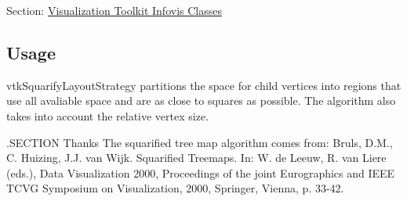 Section\-: \hyperlink{sec_vtkinfovis}{Visualization Toolkit Infovis Classes} \hypertarget{vtkwidgets_vtkxyplotwidget_Usage}{}\subsection{Usage}\label{vtkwidgets_vtkxyplotwidget_Usage}
vtk\-Squarify\-Layout\-Strategy partitions the space for child vertices into regions that use all avaliable space and are as close to squares as possible. The algorithm also takes into account the relative vertex size.

.S\-E\-C\-T\-I\-O\-N Thanks The squarified tree map algorithm comes from\-: Bruls, D.\-M., C. Huizing, J.\-J. van Wijk. Squarified Treemaps. In\-: W. de Leeuw, R. van Liere (eds.), Data Visualization 2000, Proceedings of the joint Eurographics and I\-E\-E\-E T\-C\-V\-G Symposium on Visualization, 2000, Springer, Vienna, p. 33-\/42.

